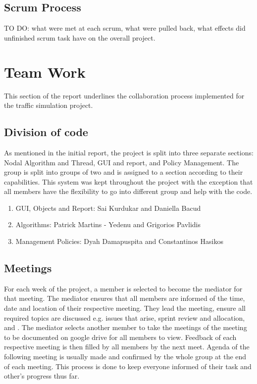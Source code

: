 \documentclass{article} \usepackage{graphicx}
\begin{document}
		\subsection{Scrum Process}
			TO DO: what were met at each scrum, what were pulled back, what effects did unfinished scrum task have on the overall project.
	\section{Team Work}
		This section of the report underlines the collaboration process implemented for the traffic simulation project.
		\subsection{Division of code}
			As mentioned in the initial report, the project is split into three separate sections: Nodal Algorithm and Thread, GUI and report, and Policy Management.  The group is split into groups of two and is assigned to a section according to their capabilities.  This system was kept throughout the project with the exception that all members have the flexibility to go into different group and help with the code.  
			
			\begin{enumerate}[noitemsep]
                \item GUI, Objects and Report: Sai Kurdukar and Daniella Bacud
                \item Algorithms: Patrick Martins - Yedenu and Grigorios Pavlidis
                \item Management Policies: Dyah Damapuspita and Constantinos Hasikos
            \end{enumerate}
			
		\subsection{Meetings}
			For each week of the project, a member is selected to become the mediator for that meeting.  The mediator ensures that all members are informed of the time, date and location of their respective meeting.  They lead the meeting, ensure all required topics are discussed e.g. issues that arise, sprint review and allocation, and .  The mediator selects another member to take the meetings of the meeting to be documented on google drive for all members to view.  Feedback of each respective meeting is then filled by all members by the next meet.  Agenda of the following meeting is usually made and confirmed by the whole group at the end of each meeting.  This process is done to keep everyone informed of their task and other's progress thus far.
			
\end{document}
